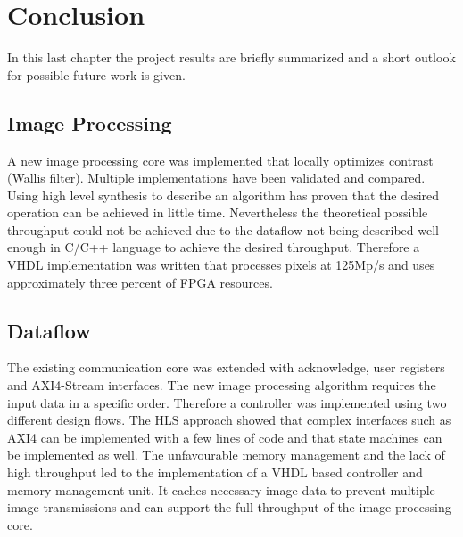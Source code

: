 %
%
\chapter{Conclusion}
In this last chapter the project results are briefly summarized and
a short outlook for possible future work is given.

%
%
\section{Image Processing}
A new image processing core was implemented that locally optimizes contrast 
(Wallis filter). Multiple implementations have been validated and compared.
Using high level synthesis to describe an algorithm has proven that the desired
operation can be achieved in little time. Nevertheless the theoretical possible
throughput could not be achieved due to the dataflow not being
described well enough in C/C++ language to achieve the desired throughput.
Therefore a VHDL implementation was written that processes pixels at 125Mp/s and
uses approximately three percent of FPGA resources.

%
%
\section{Dataflow}
The existing communication core was extended with acknowledge, user registers
and AXI4-Stream interfaces. The new image processing algorithm requires the
input data in a specific order. Therefore a controller was implemented using two
different design flows. The HLS approach showed that complex interfaces such as
AXI4 can be implemented with a few lines of code and that state machines can be
implemented as well. The unfavourable memory management and the lack of high
throughput
led to the implementation of a VHDL based controller and memory management unit.
It caches necessary image data to prevent multiple image transmissions and can
support the full throughput of the image processing core.

